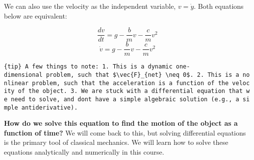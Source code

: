 We can also use the velocity as the independent variable,
\(v = \dot{y}\). Both equations below are equivalent:

\[\frac{dv}{dt} = g - \frac{b}{m}v - \frac{c}{m}v^2\]
\[\dot{v} = g - \frac{b}{m}v - \frac{c}{m}v^2\]

\texttt{\{tip\}\ A\ few\ things\ to\ note:\ 1.\ This\ is\ a\ dynamic\ one-dimensional\ problem,\ such\ that\ \$\textbackslash{}vec\{F\}\_\{net\}\ \textbackslash{}neq\ 0\$.\ 2.\ This\ is\ a\ nonlinear\ problem,\ such\ that\ the\ acceleration\ is\ a\ function\ of\ the\ velocity\ of\ the\ object.\ 3.\ We\ are\ stuck\ with\ a\ differential\ equation\ that\ we\ need\ to\ solve,\ and\ don\textquotesingle{}t\ have\ a\ simple\ algebraic\ solution\ (e.g.,\ a\ simple\ antiderivative).}

\textbf{How do we solve this equation to find the motion of the object
as a function of time?} We will come back to this, but solving
differential equations is the primary tool of classical mechanics. We
will learn how to solve these equations analytically and numerically in
this course.
